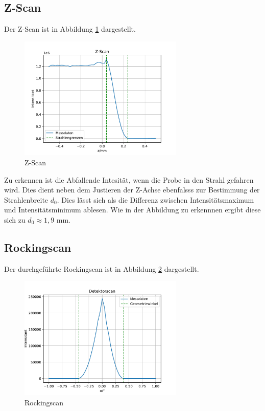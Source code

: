 \subsection{Z-Scan}
Der Z-Scan ist in Abbildung \ref{fig:Z} dargestellt.
\begin{figure}[h]
    \centering
    \includegraphics[width = 0.7\textwidth]{Auswertung/Graphen/z_Scan.pdf}
    \caption{Z-Scan}
    \label{fig:Z}
\end{figure}
Zu erkennen ist die Abfallende Intesität, wenn die Probe in den Strahl gefahren wird.
Dies dient neben dem Justieren der Z-Achse ebenfalsss zur Bestimmung der Strahlenbreite $d_0$.
Dies lässt sich als die Differenz zwischen Intensitätsmaximum und Intensitätsminimum ablesen.
Wie in der Abbildung zu erkennnen ergibt diese sich zu $d_0 \approx 1,9$ mm.



\subsection{Rockingscan}
Der durchgeführte Rockingscan ist in Abbildung \ref{fig:roc} dargestellt.
\begin{figure}[h]
    \centering
    \includegraphics[width = 0.7\textwidth]{Auswertung/Graphen/Rocking_Scan.pdf}
    \caption{Rockingscan}
    \label{fig:roc}
\end{figure}

